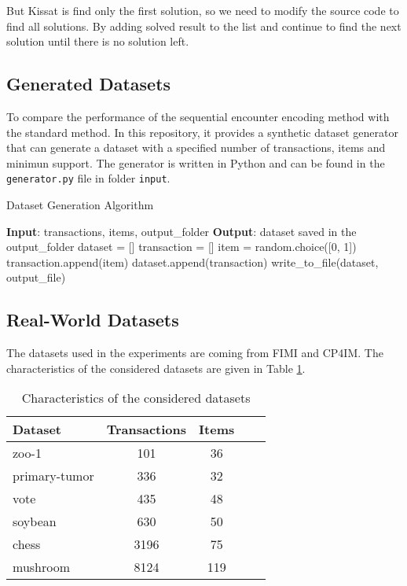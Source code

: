 But Kissat is find only the first solution, so we need to modify the source code to find all solutions.
By adding solved result to the list and continue to find the next solution until there is no solution left.

\subsection{Generated Datasets}
To compare the performance of the sequential encounter encoding method with the standard method.
In this repository, it provides a synthetic dataset generator that can generate a dataset with a specified number of transactions, items and minimun support.
The generator is written in Python and can be found in the \texttt{generator.py} file in folder \texttt{input}.

\begin{algorithm}
    \caption{Dataset Generation Algorithm}
    \begin{algorithmic}[1]
        \State \textbf{Input}: transactions, items, output\_folder
        \State \textbf{Output}: dataset saved in the output\_folder
        \State dataset = []
        \State transaction = []
        \State item = random.choice([0, 1])
        \State transaction.append(item)
        \EndFor
        \State dataset.append(transaction)
        \EndFor
        \State write\_to\_file(dataset, output\_file)
    \end{algorithmic}
\end{algorithm}

\subsection{Real-World Datasets}
The datasets used in the experiments are coming from FIMI\cite{FIMI} and CP4IM\cite{CP4IM}.
The characteristics of the considered datasets are given in Table \ref{tab:datasets}.
\begin{table}[H]
    \centering
    \caption{Characteristics of the considered datasets}
    \label{tab:datasets}
    \begin{tabular}{|l|c|c|c|c|}
        \hline
        Dataset       & Transactions & Items \\
        \hline
        zoo-1         & 101          & 36    \\
        primary-tumor & 336          & 32    \\
        vote          & 435          & 48    \\
        soybean       & 630          & 50    \\
        chess         & 3196         & 75    \\
        mushroom      & 8124         & 119   \\
        \hline
    \end{tabular}
\end{table}

